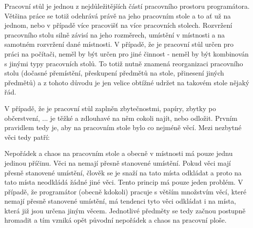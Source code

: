 
Pracovní stůl je jednou z nejdůležitějších částí pracovního prostoru programátora. Většina práce se totiž odehrává právě na jeho pracovním stole a to ať už na jednom, nebo v případě více pracovišť na více pracovních stolech. Rozvržení pracovního stolu silně závisí na jeho rozměrech, umístění v místnosti a na samotném rozvržení dané místnosti. V případě, že je pracovní stůl určen pro práci na počítači, neměl by být určen pro jiné činnost - neměl by být kombinován s jinými typy pracovních stolů. To totiž nutně znamená reorganizaci pracovního stolu (dočasné přemístění, přeskupení předmětů na stole, přinesení jiných předmětů) a z tohoto důvodu je jen velice obtížné udržet na takovém stole nějaký řád.

V případě, že je pracovní stůl zaplněn zbytečnostmi, papíry, zbytky po občerstvení, ... je těžké a zdlouhavé na něm cokoli najít, nebo odložit. Prvním pravidlem tedy je, aby na pracovním stole bylo co nejméně věcí. Mezi nezbytné věci tedy patří:


Nepořádek a chaos na pracovním stole a obecně v místnosti má pouze jednu jedinou příčinu. Věci na nemají přesně stanovené umístění. Pokud věci mají přesně stanovené umístění, člověk se je snaží na tato místa odkládat a proto na tato místa neodkládá žádné jiné věci. Tento princip má pouze jeden problém. V případě, že programátor (obecně kdokoli) pracuje s větším množstvím věcí, které nemají přesně stanovené umístění, má tendenci tyto věci odkládat i na místa, která již jsou určena jiným věcem. Jednotlivé předměty se tedy začnou postupně hromadit a tím vzniká opět původní nepořádek a chaos na pracovní ploše.


